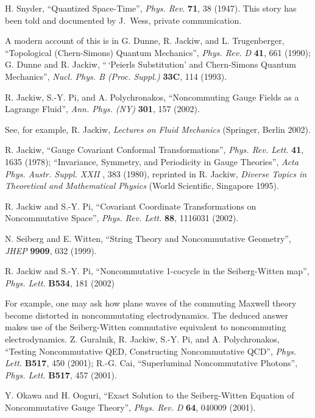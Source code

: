 \documentclass[a4paper,12pt,twoside]{article}
\begin{document}
 \newpage 
\def\Journal#1#2#3#4{{\em #1} {\bf #2}, #3 (#4)}
\def\add#1#2#3{{\bf #1}, #2 (#3)}
\def\Book#1#2#3#4{{\em #1}  (#2, #3 #4)}
\def\Bookeds#1#2#3#4#5{{\em #1}, #2  (#3, #4 #5)}

\begin{thebibliography}{99}

H. Snyder, ``Quantized Space-Time'', \Journal{Phys. Rev.}{71}{38}{1947}. This story has been
told and documented by J.~Wess, private communication.

A modern account of this is in 
G. Dunne, R. Jackiw, and L. Trugenberger, ``Topological
(Chern-Simons) Quantum Mechanics'',
\Journal{Phys. Rev. D}{41}{661}{1990};
G. Dunne and R. Jackiw, ``\,`Peierls Substitution' and Chern-Simons  Quantum Mechanics'', 
\Journal{Nucl. Phys. B (Proc. Suppl.)}{33C}{114}{1993}.


R. Jackiw, S.-Y. Pi, and A. Polychronakos, ``Noncommuting Gauge Fields as a Lagrange Fluid'',
\Journal{Ann. Phys. (NY)}{301}{157}{2002}.

See, for example, 
R. Jackiw, \Book{Lectures on Fluid Mechanics}{Springer}{Berlin}{2002}. 

R. Jackiw,  ``Gauge Covariant Conformal Transformations'',
\Journal{Phys. Rev. Lett.}{41}{1635}{1978};
``Invariance, Symmetry, and Periodicity in Gauge Theories'',
\Journal{Acta Phys. Austr. Suppl. XXII}{}{383}{1980}, reprinted in
R. Jackiw, \Book{Diverse Topics in Theoretical and Mathematical Physics}{World
Scientific}{Singapore}{1995}. 

R. Jackiw and S.-Y. Pi,  ``Covariant Coordinate Transformations on Noncommutative Space'',
\Journal{Phys. Rev. Lett.}{88}{1116031}{2002}.

N. Seiberg and E. Witten,  ``String Theory and Noncommutative Geometry'',
\Journal{JHEP}{9909}{032}{1999}.

R. Jackiw and S.-Y. Pi, ``Noncommutative 1-cocycle in the Seiberg-Witten map'', 
\Journal{Phys. Lett.}{B534}{181}{2002}

For example, one may ask how plane waves of the commuting Maxwell theory become
distorted in noncommutating electrodynamics. The deduced answer makes use of the
Seiberg-Witten commutative equivalent to noncommuting electrodynamics.   Z. Guralnik, R.
Jackiw, S.-Y. Pi, and A. Polychronakos, ``Testing Noncommutative QED, Constructing
Noncommutative QCD'',
\Journal{Phys. Lett.}{B517}{450}{2001};  R.-G. Cai, ``Superluminal Noncommutative Photons'',
\Journal{Phys. Lett.}{B517}{457}{2001}.

Y. Okawa and H. Ooguri, ``Exact Solution to the Seiberg-Witten Equation of Noncommutative
Gauge Theory'',
\Journal{Phys. Rev. D}{64}{040009}{2001}.





\end{thebibliography}
\end{document}
